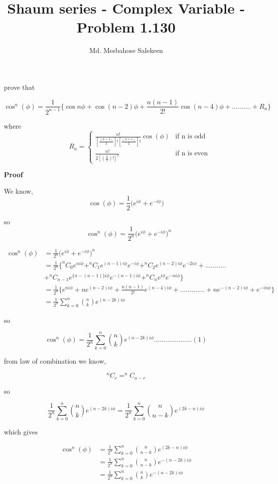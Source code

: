 \documentclass[fleqn]{article}
\title{Shaum series - Complex Variable - Problem 1.130}
\author{Md. Mesbahose Salekeen}
\begin{document}
\maketitle

prove that 

$$\cos^{n}(\phi)= \frac{1}{2^{n-1}}\{\cos n\phi+\cos(n-2)\phi+\frac{n(n-1)}{2!}\cos(n-4)\phi+..........+R_{n}\}$$

where \[ \hspace{48pt} R_{n} = \begin{cases} 
      \frac{n!}{[\frac{(n-1)}{2}]![\frac{(n+1)}{2}]!}\cos(\phi) & \text{if n is odd} \\
      \frac{n!}{2[(\frac{n}{2})!]^{2}} & \text{if n is even} 
   \end{cases}
\]

\textbf{Proof}

We know,
$$\cos(\phi) = \frac{1}{2}\bigg(e^{i\phi}+e^{-i\phi}\bigg)$$

so 
$$\hspace{10pt}\cos^{n}(\phi) = \frac{1}{2^{n}}\bigg(e^{i\phi}+e^{-i\phi}\bigg)^{n}$$


\begin{align*}
\cos^{n}(\phi) &= \frac{1}{2^{n}}\bigg(e^{i\phi}+e^{-i\phi}\bigg)^{n}\\
            &= \frac {1}{2^{n}}\{^{n}C_{0}e^{ni\phi}+^{n}C_{1}e^{(n-1)i\phi}e^{-i\phi}+^{n}C_{2}e^{(n-2)i\phi}e^{-2i\phi}+...........\\
            &+^{n}C_{n-1}e^{\{n-(n-1)\}i\phi}e^{-(n-1)i\phi}+^{n}C_{n}e^{i\phi}e^{-ni\phi}\}\\
            &= \frac{1}{2^{n}}\{e^{ni\phi}+ne^{(n-2)i\phi}+\frac{n(n-1)}{2!}e^{(n-4)i\phi}+.............+ne^{-(n-2)i\phi}+e^{-in\phi}\}\\
            &=\frac{1}{2^{n}}\sum_{k=0}^{n}\binom{n}{k}e^{(n-2k)i\phi}
\end{align*}

so 

$$\cos^{n}(\phi)=\frac{1}{2^{n}}\sum_{k=0}^{n}\binom{n}{k}e^{(n-2k)i\phi}....................(1)$$

from law of combination we know,

$$^{n}C_{r} = ^{n}C_{n-r}$$

so 

$$\frac{1}{2^{n}}\sum_{k=0}^{n}\binom{n}{k}e^{(n-2k)i\phi} = \frac{1}{2^{n}}\sum_{k=0}^{n}\binom{n}{n-k}e^{(2k-n)i\phi}$$

which gives

\begin{align*}
\cos^{n}(\phi) &=\frac{1}{2^{n}}\sum_{k=0}^{n}\binom{n}{n-k}e^{(2k-n)i\phi}\\
			   &= \frac{1}{2^{n}}\sum_{k=0}^{n}\binom{n}{n-k}e^{-(n-2k)i\phi}\\
			   &= \frac{1}{2^{n}}\sum_{k=0}^{n}\binom{n}{k}e^{-(n-2k)i\phi}
\end{align*}
\end{document}
